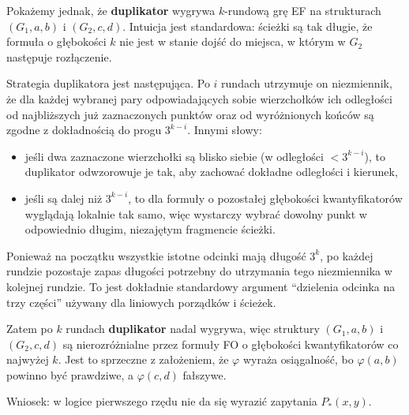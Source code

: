 \documentclass{article}
\begin{document}
Pokażemy jednak, że \textbf{duplikator} wygrywa $k$-rundową grę EF na strukturach $(G_1, a, b)$ i $(G_2, c, d)$. Intuicja jest standardowa: ścieżki są tak długie, że formuła o głębokości $k$ nie jest w stanie dojść do miejsca, w którym w $G_2$ następuje rozłączenie.

Strategia duplikatora jest następująca. Po $i$ rundach utrzymuje on niezmiennik, że dla każdej wybranej pary odpowiadających sobie wierzchołków ich odległości od najbliższych już zaznaczonych punktów oraz od wyróżnionych końców są zgodne z dokładnością do progu $3^{k-i}$. Innymi słowy:
\begin{itemize}
        \item jeśli dwa zaznaczone wierzchołki są blisko siebie (w odległości $< 3^{k-i}$), to duplikator odwzorowuje je tak, aby zachować dokładne odległości i kierunek,
        \item jeśli są dalej niż $3^{k-i}$, to dla formuły o pozostałej głębokości kwantyfikatorów wyglądają lokalnie tak samo, więc wystarczy wybrać dowolny punkt w odpowiednio długim, niezajętym fragmencie ścieżki.
\end{itemize}
Ponieważ na początku wszystkie istotne odcinki mają długość $3^k$, po każdej rundzie pozostaje zapas długości potrzebny do utrzymania tego niezmiennika w kolejnej rundzie. To jest dokładnie standardowy argument ``dzielenia odcinka na trzy części'' używany dla liniowych porządków i ścieżek.

Zatem po $k$ rundach \textbf{duplikator} nadal wygrywa, więc struktury $(G_1, a, b)$ i $(G_2, c, d)$ są nierozróżnialne przez formuły FO o głębokości kwantyfikatorów co najwyżej $k$. Jest to sprzeczne z założeniem, że $\varphi$ wyraża osiągalność, bo $\varphi(a,b)$ powinno być prawdziwe, a $\varphi(c,d)$ fałszywe.

Wniosek: w logice pierwszego rzędu nie da się wyrazić zapytania $P_*(x, y)$.
\end{document}
